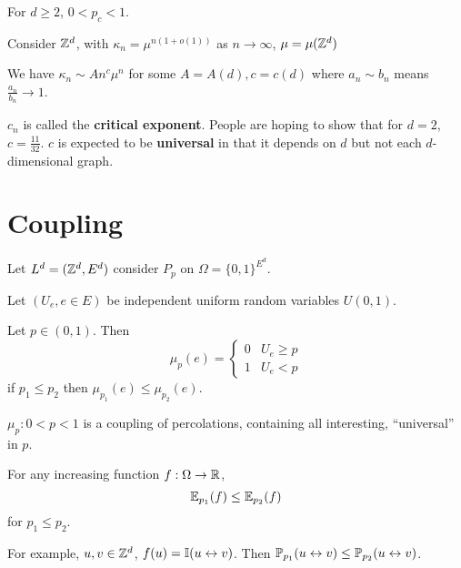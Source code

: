 \begin{thm}
  \label{defn:random_walks_on_graphs:3}
  For $d \geq 2$, $0 < p_{c} < 1$.
\end{thm}


Consider $\mathbb{Z}^{d}$, with $\kappa_{n} = \mu^{n(1 + o(1))}$ as $n
\rightarrow \infty$, $\mu = \mu(\mathbb{Z}^{d})$

We have $\kappa_{n} \sim A n^{c} \mu^{n}$ for some $A = A(d), c =
c(d)$ where $a_{n} \sim b_{n}$ means $\frac{a_{n}}{b_{n}} \rightarrow
1$.

$c_{n}$ is called the \textbf{critical exponent}.  People are hoping
to show that for $d=2$, $c=\frac{11}{32}$.  $c$ is expected to be
\textbf{universal} in that it depends on $d$ but not each
$d$-dimensional graph.


\section{Coupling}
\label{sec:coupling}

Let $L^{d} = (\mathbb{Z}^{d}, E^{d})$ consider $P_{p}$ on $\Omega = \{ 0,
1\}^{E^d}$.

Let $(U_{e}, e \in E)$ be independent uniform random variables $U(0,
1)$.

Let $p \in (0, 1)$.  Then
\begin{equation}
  \label{eq:1}
  \mu_{p}(e) =
  \begin{cases}
    0 & U_{e} \geq p \\
    1 & U_{e} < p
  \end{cases}  
\end{equation}
if $p_{1} \leq p_{2}$ then $\mu_{p_{1}}(e) \leq \mu_{p_{2}}(e)$.

$\mu_{p}: 0 < p < 1$ is a coupling of percolations, containing all
interesting, ``universal'' in $p$.

\begin{thm}
  \label{defn:random_walks_on_graphs:4}
  For any increasing function $f: \Omega \rightarrow \mathbb{R}$,
  \begin{equation}
    \label{eq:2}
    \E{f}{p_{1}} \leq \E{f}{p_{2}}
  \end{equation} for $p_{1} \leq p_{2}$.
\end{thm}

\begin{exmp}
  \label{defn:random_walks_on_graphs:5}
  For example, $u, v \in \mathbb{Z}^{d}$, $f(u) = \I{u \leftrightarrow v}$.
  Then $\Prob{u \leftrightarrow v}{p_{1}} \leq \Prob{u \leftrightarrow
  v}{p_{2}}$.
\end{exmp}

